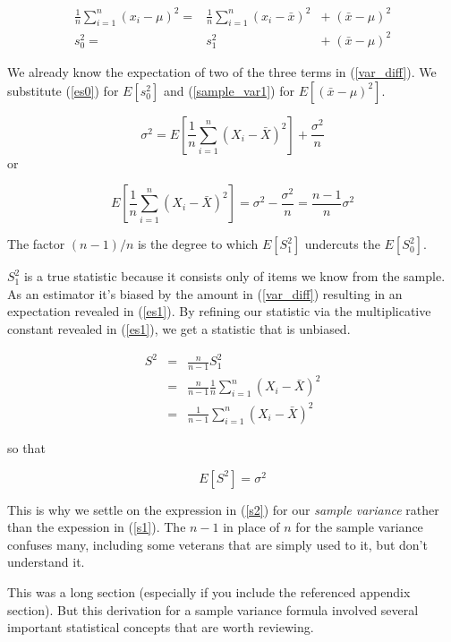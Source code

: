 \documentclass[]{article}
\begin{document}
\begin{eqnarray}
\frac{1}{n} \sum_{i=1}^n (x_i - \mu)^2
  = & \frac{1}{n} \sum_{i=1}^n (x_i - \bar{x})^2 & + \;
  (\bar{x} - \mu)^2  \nonumber \\
s_0^2 = & s_1^2 & + \; (\bar{x} - \mu)^2 \label{var_diff}
\end{eqnarray}

We already know the expectation of two of the three terms
in (\ref{var_diff}).  We substitute (\ref{es0}) for $E[s_0^2]$
and (\ref{sample_var1}) for $E[(\bar{x} - \mu)^2]$.

$$
\sigma^2 = E\left[ \frac{1}{n} \sum_{i=1}^n (X_i - \bar{X})^2 \right]
  + \frac{\sigma^2}{n}
$$
or

\begin{equation}
E\left[ \frac{1}{n} \sum_{i=1}^n (X_i - \bar{X})^2 \right]
  = \sigma^2 - \frac{\sigma^2}{n} = \frac{n-1}{n} \sigma^2 \label{es1}
\end{equation}

The factor $(n-1)/n$ is the degree to which $E[S_1^2]$ undercuts
the $E[S_0^2]$.

$S_1^2$ is a true statistic because it consists only of items we know
from the sample.  As an estimator it's biased by the amount in
(\ref{var_diff}) resulting in an expectation revealed in (\ref{es1}).
By refining our statistic via the multiplicative constant revealed in
(\ref{es1}), we get a statistic that is unbiased.

\begin{eqnarray}
S^2 &= & \frac{n}{n-1} S_1^2 \nonumber \\
    &= & \frac{n}{n-1} \frac{1}{n} \sum_{i=1}^n \left( X_i - \bar{X} \right)^2 \nonumber \\
    &= & \frac{1}{n-1} \sum_{i=1}^n \left( X_i - \bar{X} \right)^2 \label{s2}
\end{eqnarray}

so that

$$
E \left[S^2 \right] = \sigma^2
$$

This is why we settle on the expression in (\ref{s2})
for our \emph{sample variance} rather than the expession
in (\ref{s1}).  The $n-1$ in place of $n$ for the sample
variance confuses many, including some veterans that are
simply used to it, but don't understand it.

This was a long section (especially if you include the
referenced appendix section).   But this derivation for
a sample variance formula involved several
important statistical concepts that are worth reviewing.
\end{document}
